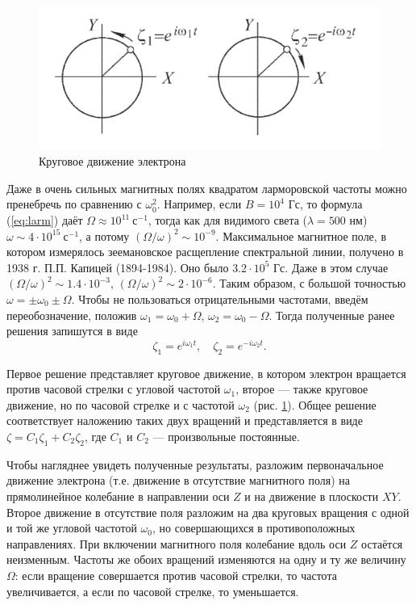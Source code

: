 \documentclass[12pt]{article}
\begin{document}
  \begin{figure}
    \centering
    \includegraphics[]{circle.png}
    \caption{Круговое движение электрона}
    \label{fig:circle}
  \end{figure}

  Даже в очень сильных магнитных полях квадратом ларморовской частоты можно пренебречь по сравнению с $\omega_0^2$. Например, если $B = 10^4$ Гс, то формула (\ref{eq:larm}) даёт $\Omega \approx 10^{11}~\text{с}^{-1}$, тогда как для видимого света ($\lambda = 500$ нм) $\omega \sim 4 \cdot 10^{15}~\text{с}^{-1}$, а потому $(\Omega/\omega)^2 \sim 10^{-9}$. Максимальное магнитное поле, в котором измерялось зеемановское расщепление спектральной линии, получено в 1938 г. П.П. Капицей (1894-1984). Оно было $3.2 \cdot 10^5$ Гс. Даже в этом случае $(\Omega/\omega)^2 \sim 1.4 \cdot 10^{-3}$, $(\Omega/\omega)^2 \sim 2 \cdot 10^{-6}$. Таким образом, с большой точностью $\omega = \pm \omega_0 \pm \Omega$. Чтобы не пользоваться отрицательными частотами, введём переобозначение, положив $\omega_1 = \omega_0 + \Omega$, $\omega_2 = \omega_0 - \Omega$. Тогда полученные ранее решения запишутся в виде
  \[
  \zeta_1 = e^{i\omega_1 t}, \quad \zeta_2 = e^{-i\omega_2 t}.
  \]

  Первое решение представляет круговое движение, в котором электрон вращается против часовой стрелки с угловой частотой $\omega_1$, второе — также круговое движение, но по часовой стрелке и с частотой $\omega_2$ (рис. \ref{fig:circle}). Общее решение соответствует наложению таких двух вращений и представляется в виде $\zeta = C_1 \zeta_1 + C_2 \zeta_2$, где $C_1$ и $C_2$ — произвольные постоянные.

  Чтобы нагляднее увидеть полученные результаты, разложим первоначальное движение электрона (т.е. движение в отсутствие магнитного поля) на прямолинейное колебание в направлении оси $Z$ и на движение в плоскости $XY$. Второе движение в отсутствие поля разложим на два круговых вращения с одной и той же угловой частотой $\omega_0$, но совершающихся в противоположных направлениях. При включении магнитного поля колебание вдоль оси $Z$ остаётся неизменным. Частоты же обоих вращений изменяются на одну и ту же величину $\Omega$: если вращение совершается против часовой стрелки, то частота увеличивается, а если по часовой стрелке, то уменьшается.
\end{document}
